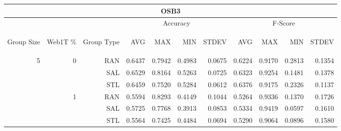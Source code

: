 \begin{center}
\begin{table}[htbp]
\begin{tabular}{ | r | r | r | r | r | r | r | r | r | r | r |}
\hline
\multicolumn{11}{|c|}{OSB3}\\
\hline
 & & & \multicolumn{4}{|c|}{Accuracy} & \multicolumn{4}{|c|}{F-Score}\\ \cline{4-11}
\begin{sideways}Group Size\end{sideways} & \begin{sideways}Web1T \%\end{sideways} & \begin{sideways}Group Type\end{sideways} & \begin{sideways}AVG\end{sideways} & \begin{sideways}MAX\end{sideways} & \begin{sideways}MIN\end{sideways} & \begin{sideways}STDEV\end{sideways} & \begin{sideways}AVG\end{sideways} & \begin{sideways}MAX\end{sideways} & \begin{sideways}MIN\end{sideways} & \begin{sideways}STDEV\end{sideways}\\
\hline
\multirow{18}{*}{5}
 & \multirow{3}{*}{0} & RAN & 0.6437 & 0.7942 & 0.4983 & 0.0675 & 0.6224 & 0.9170 & 0.2813 & 0.1354\\ \cline{3-11}
 &   & SAL & 0.6529 & 0.8164 & 0.5263 & 0.0725 & 0.6323 & 0.9254 & 0.1481 & 0.1378\\ \cline{3-11}
 &   & STL & 0.6459 & 0.7520 & 0.5284 & 0.0612 & 0.6376 & 0.9175 & 0.2326 & 0.1137\\ \cline{2-11}
 & \multirow{3}{*}{1} & RAN & 0.5594 & 0.8293 & 0.4149 & 0.1044 & 0.5264 & 0.9336 & 0.1370 & 0.1726\\ \cline{3-11}
 &   & SAL & 0.5725 & 0.7768 & 0.3913 & 0.0853 & 0.5334 & 0.9419 & 0.0597 & 0.1610\\ \cline{3-11}
 &   & STL & 0.5564 & 0.7425 & 0.4484 & 0.0694 & 0.5290 & 0.9064 & 0.0896 & 0.1580\\ \cline{2-11}

\end{tabular}
\end{table}
\end{center}

